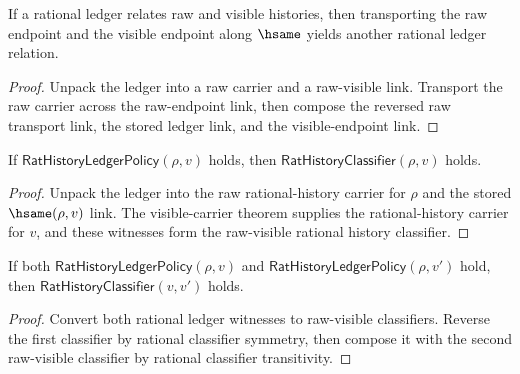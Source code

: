\begin{theorem}
\label{thm:rat-ledger-hsame-transport}
If a rational ledger relates raw and visible histories, then transporting the
raw endpoint and the visible endpoint along \(\hsame\) yields another rational
ledger relation.
\end{theorem}
\begin{proof}
Unpack the ledger into a raw carrier and a raw-visible link. Transport the raw
carrier across the raw-endpoint link, then compose the reversed raw transport
link, the stored ledger link, and the visible-endpoint link.
\end{proof}

\begin{theorem}
\label{thm:rat-ledger-raw-visible-classifier}
If $\mathsf{RatHistoryLedgerPolicy}(\rho,v)$ holds, then
$\mathsf{RatHistoryClassifier}(\rho,v)$ holds.
\end{theorem}
\begin{proof}
Unpack the ledger into the raw rational-history carrier for $\rho$ and the
stored $\hsame(\rho,v)$ link. The visible-carrier theorem supplies the
rational-history carrier for $v$, and these witnesses form the raw-visible
rational history classifier.
\end{proof}

\begin{theorem}
\label{thm:rat-history-ledger-policy-shared-raw-visible-classifier}
If both $\mathsf{RatHistoryLedgerPolicy}(\rho,v)$ and
$\mathsf{RatHistoryLedgerPolicy}(\rho,v')$ hold, then
$\mathsf{RatHistoryClassifier}(v,v')$ holds.
\end{theorem}
\begin{proof}
Convert both rational ledger witnesses to raw-visible classifiers. Reverse the
first classifier by rational classifier symmetry, then compose it with the
second raw-visible classifier by rational classifier transitivity.
\end{proof}

